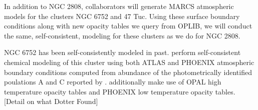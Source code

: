 In addition to NGC 2808, collaborators will generate MARCS atmospheric models for the
clusters NGC 6752 and 47 Tuc. Using these surface boundary conditions along
with new opacity tables we query from OPLIB, we will conduct the same,
self-consistent, modeling for these clusters as we do for NGC 2808.

NGC 6752 has been self-consistently modeled in past. \citet{Dotter2015} perform
self-consistent chemical modeling of this cluster using both ATLAS and PHOENIX
atmospheric boundary conditions computed from abundance of the photometrically
identified poulations A and C reported by \citet{Milone2013}.
\citeauthor{Dotter2015} additionally make use of OPAL high temperature opacity
tables and PHOENIX low temperature opacity tables. {\color{red}[Detail on what Dotter Found]} 
